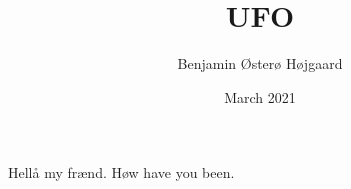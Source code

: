 \documentclass[a4paper, 12pt]{article}
\title{UFO}
\author{Benjamin Østerø Højgaard}
\date{March 2021}
\begin{document}
\maketitle
Hellå my frænd. Høw have you been.

\newpage
{}
\tableofcontents
\newpage


\newpage


\newpage


\newpage


\newpage


\newpage


\newpage


\newpage
\end{document}
